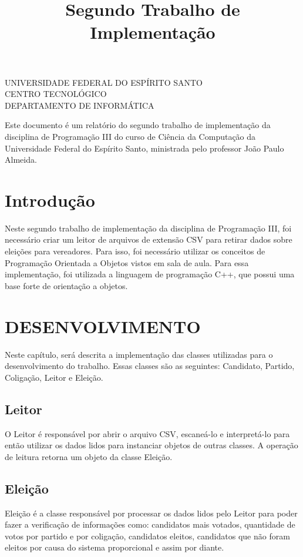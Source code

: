 \documentclass[oneside]{abntex2}
\title{Segundo Trabalho de Implementação}
\renewcommand{\imprimircapa}{
	\begin{capa}
		\center

		\ABNTEXchapterfont\large UNIVERSIDADE FEDERAL DO ESPÍRITO SANTO \\ CENTRO TECNOLÓGICO \\ DEPARTAMENTO DE INFORMÁTICA

		\vfill
		\begin{center}
		\ABNTEXchapterfont\bfseries\LARGE\imprimirtitulo
		\end{center}
		\vfill

		\ABNTEXchapterfont\large\imprimirautor
		\vfill

		\large\imprimirlocal

		\large\imprimirdata

		\vspace*{1cm}
	\end{capa}
}
\begin{document}
	\imprimircapa
	\imprimirfolhaderosto

	\begin{resumo}
	Este documento é um relatório do segundo trabalho de implementação da disciplina de Programação III do curso de Ciência da Computação da Universidade Federal do Espírito Santo, ministrada pelo professor João Paulo Almeida.
	\end{resumo}

	\tableofcontents
	\newpage

	\textual

	\chapter*{Introdução}
Neste segundo trabalho de implementação da disciplina de Programação III, foi necessário criar um leitor de arquivos de extensão CSV para retirar dados sobre eleições para vereadores. Para isso, foi necessário utilizar os conceitos de Programação Orientada a Objetos vistos em sala de aula. Para essa implementação, foi utilizada a linguagem de programação C++, que possui uma base forte de orientação a objetos.

    \newpage
    \chapter{DESENVOLVIMENTO}
Neste capítulo, será descrita a implementação das classes utilizadas para o desenvolvimento do trabalho. Essas classes são as seguintes: Candidato, Partido, Coligação, Leitor e Eleição.

	\section{Leitor}
O Leitor é responsável por abrir o arquivo CSV, escaneá-lo e interpretá-lo para então utilizar os dados lidos para instanciar objetos de outras classes. A operação de leitura retorna um objeto da classe Eleição.

	\section{Eleição}
Eleição é a classe responsável por processar os dados lidos pelo Leitor para poder fazer a verificação de informações como: candidatos mais votados, quantidade de votos por partido e por coligação, candidatos eleitos, candidatos que não foram eleitos por causa do sistema proporcional e assim por diante.
\end{document}

